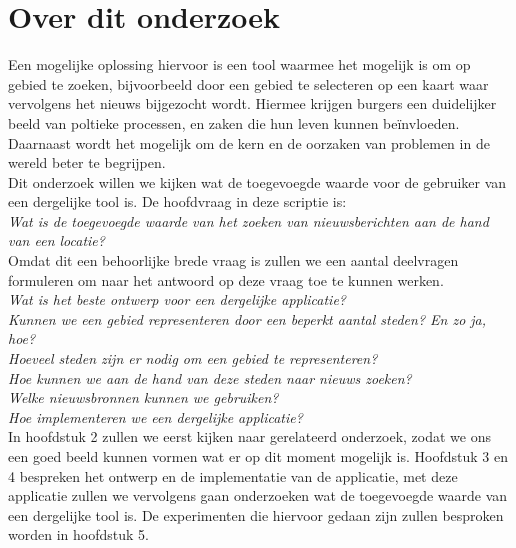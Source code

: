 \documentclass[twoside,openright]{uva-bachelor-thesis}
\begin{document}
	\section{Over dit onderzoek}
		Een mogelijke oplossing hiervoor is een tool waarmee het mogelijk is om op gebied te zoeken, bijvoorbeeld door een gebied te selecteren op een kaart waar vervolgens het nieuws bijgezocht wordt. Hiermee krijgen burgers een duidelijker beeld van poltieke processen, en zaken die hun leven kunnen be\"invloeden. Daarnaast wordt het mogelijk om de kern en de oorzaken van problemen in de wereld beter te begrijpen.
		\\[0.5cm]
		Dit onderzoek willen we kijken wat de toegevoegde waarde voor de gebruiker van een dergelijke tool is. De hoofdvraag in deze scriptie is:
		\\[0.5cm]
		\indent \textit{Wat is de toegevoegde waarde van het zoeken van nieuwsberichten aan de hand van een locatie?}
		\\[0.5cm]
		Omdat dit een behoorlijke brede vraag is zullen we een aantal deelvragen formuleren om naar het antwoord op deze vraag toe te kunnen werken.
		\\[0.5cm]
		\indent \textit{Wat is het beste ontwerp voor een dergelijke applicatie?} \\[0.2cm]
		\indent \textit{Kunnen we een gebied representeren door een beperkt aantal steden? En zo ja, hoe?} \\[0.2cm]
		\indent \textit{Hoeveel steden zijn er nodig om een gebied te representeren?} \\[0.2cm]
		\indent \textit{Hoe kunnen we aan de hand van deze steden naar nieuws zoeken?}\\[0.2cm]
		\indent \textit{Welke nieuwsbronnen kunnen we gebruiken?}\\[0.2cm]
		\indent \textit{Hoe implementeren we een dergelijke applicatie?}\\[0.5cm]
		
		In hoofdstuk 2 zullen we eerst kijken naar gerelateerd onderzoek, zodat we ons een goed beeld kunnen vormen wat er op dit moment mogelijk is. Hoofdstuk 3 en 4 bespreken het ontwerp en de implementatie van de applicatie, met deze applicatie zullen we vervolgens gaan onderzoeken wat de toegevoegde waarde van een dergelijke tool is. De experimenten die hiervoor gedaan zijn zullen besproken worden in hoofdstuk 5.
\end{document}

